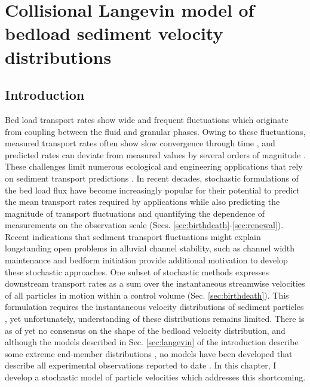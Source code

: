 
\chapter{Collisional Langevin model of bedload sediment velocity distributions}
\label{ch:langevin}
\section{Introduction}

Bed load transport rates show wide and frequent fluctuations which originate from coupling between the fluid and granular phases.
Owing to these fluctuations, measured transport rates often show slow convergence through time \citep{Dhont2018,Turowski2010}, and predicted rates can deviate from measured values by several orders of magnitude \citep{Recking2012,Martin2003}.
These challenges limit numerous ecological and engineering applications that rely on sediment transport predictions \citep{Gaeuman2017,Malmon2005}.
In recent decades, stochastic formulations of the bed load flux have become increasingly popular for their potential to predict the mean transport rates required by applications while also predicting the magnitude of transport fluctuations and quantifying the dependence of measurements on the observation scale (Secs. \ref{sec:birthdeath}-\ref{sec:renewal}).
Recent indications that sediment transport fluctuations might explain longstanding open problems in alluvial channel stability, such as channel width maintenance \citep{Abramian2019,Abramian2020} and bedform initiation \citep{Jerolmack2005,Bohorquez2016} provide additional motivation to develop these stochastic approaches.
One subset of stochastic methods expresses downstream transport rates as a sum over the instantaneous streamwise velocities of all particles in motion within a control volume (Sec. \ref{sec:birthdeath}).
This formulation requires the instantaneous velocity distributions of sediment particles \citep[e.g.][]{Ancey2020a}, yet unfortunately, understanding of these distributions remains limited.
There is as of yet no consensus on the shape of the bedload velocity distribution, and although the models described in Sec. \ref{sec:langevin} of the introduction describe some extreme end-member distributions \citep[e.g.][]{Fan2014,Ancey2014}, no models have been developed that describe all experimental observations reported to date \citep{Lajeunesse2010,Fathel2015,Heyman2016,Liu2019,Houssais2012}.
In this chapter, I develop a stochastic model of particle velocities which addresses this shortcoming.

